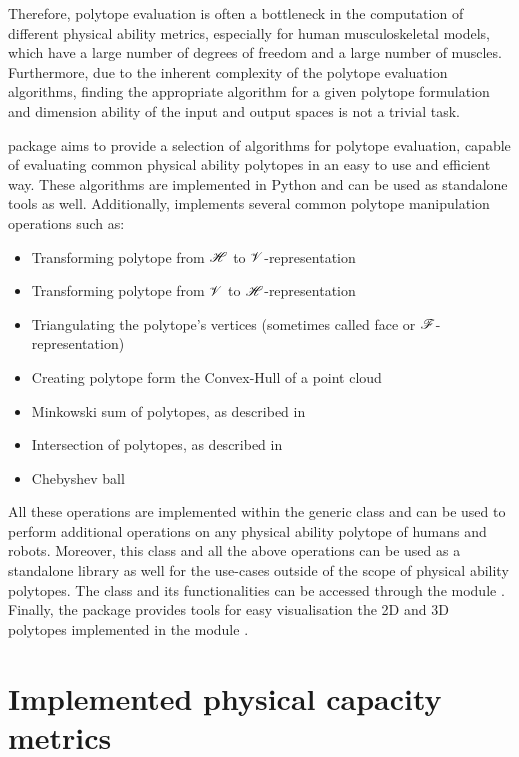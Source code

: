 Therefore, polytope evaluation is often a bottleneck in the computation of different physical ability metrics, especially for human musculoskeletal models, which have a large number of degrees of freedom and a large number of muscles. Furthermore, due to the inherent complexity of the polytope evaluation algorithms, finding the appropriate algorithm for a given polytope formulation and dimension ability of the input and output spaces is not a trivial task.


 package aims to provide a selection of algorithms for polytope evaluation, capable of evaluating common physical ability polytopes in an easy to use and efficient way.  These algorithms are implemented in Python and can be used as standalone tools as well. 
Additionally,  implements several common polytope manipulation operations such as: 
\begin{itemize}
    \item Transforming polytope from $\mathscr{H}$ to  $\mathscr{V}$-representation
    \item Transforming polytope from $\mathscr{V}$ to  $\mathscr{H}$-representation
    \item Triangulating the polytope's vertices (sometimes called face or $\mathscr{F}$-representation) 
    \item Creating polytope form the Convex-Hull of a point cloud
    \item Minkowski sum of polytopes, as described in 
    \item Intersection of polytopes, as described in 
    \item Chebyshev ball
\end{itemize}
All these operations are implemented within the generic class  and can be used to perform additional operations on any physical ability polytope of humans and robots. Moreover, this class and all the above operations can be used as a standalone library as well for the use-cases outside of the scope of physical ability polytopes. The  class and its functionalities can be accessed through the module . Finally, the package provides tools for easy visualisation the 2D and 3D polytopes implemented in the module .

\section{Implemented physical capacity metrics}

